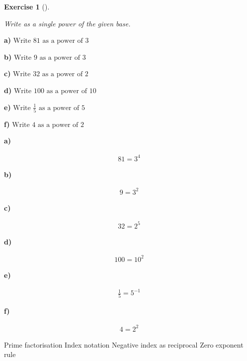 \documentclass[
  letterpaper,
  DIV=11,
  numbers=noendperiod]{scrreprt}
\theoremstyle{definition}
\newtheorem{exercise}{Exercise}[chapter]
\theoremstyle{remark}
\begin{document}
\begin{exercise}[]\protect\hypertarget{exr-u2-26}{}\label{exr-u2-26}

\emph{Write as a single power of the given base.}

\textbf{a)} \(\displaystyle \text{Write }81\text{ as a power of }3\)

\textbf{b)} \(\displaystyle \text{Write }9\text{ as a power of }3\)

\textbf{c)} \(\displaystyle \text{Write }32\text{ as a power of }2\)

\textbf{d)} \(\displaystyle \text{Write }100\text{ as a power of }10\)

\textbf{e)}
\(\displaystyle \text{Write }\frac{1}{5}\text{ as a power of }5\)

\textbf{f)} \(\displaystyle \text{Write }4\text{ as a power of }2\)

\begin{tcolorbox}[enhanced jigsaw, opacitybacktitle=0.6, coltitle=black, arc=.35mm, colframe=quarto-callout-tip-color-frame, colback=white, bottomrule=.15mm, left=2mm, colbacktitle=quarto-callout-tip-color!10!white, titlerule=0mm, opacityback=0, title=\textcolor{quarto-callout-tip-color}{\faLightbulb}\hspace{0.5em}{🔍 View Solutions}, leftrule=.75mm, breakable, rightrule=.15mm, bottomtitle=1mm, toptitle=1mm, toprule=.15mm]

\textbf{a)}

\[
\begin{aligned}
81=3^{4}
\end{aligned}
\]

\textbf{b)}

\[
\begin{aligned}
9=3^{2}
\end{aligned}
\]

\textbf{c)}

\[
\begin{aligned}
32=2^{5}
\end{aligned}
\]

\textbf{d)}

\[
\begin{aligned}
100=10^{2}
\end{aligned}
\]

\textbf{e)}

\[
\begin{aligned}
\frac{1}{5}=5^{-1}
\end{aligned}
\]

\textbf{f)}

\[
\begin{aligned}
4=2^{2}
\end{aligned}
\]

\end{tcolorbox}

{Prime factorisation} {Index notation} {Negative index as reciprocal}
{Zero exponent rule}

\end{exercise}
\end{document}
